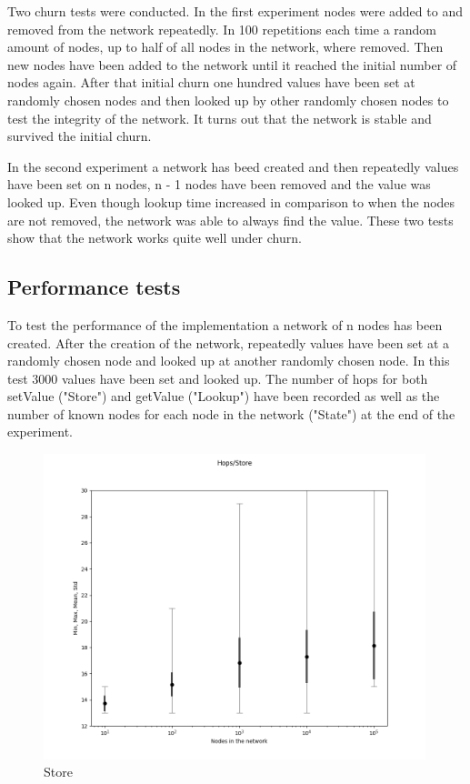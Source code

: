 \documentclass[a4paper, 12pt]{article} %
\begin{document}
Two churn tests were conducted. In the first experiment nodes were added to and removed from the network repeatedly. In 100 repetitions each time a random amount of nodes, up to half of all nodes in the network, where removed. Then new nodes have been added to the network until it reached the initial number of nodes again.  After that initial churn one hundred values have been set at randomly chosen nodes and then looked up by other randomly chosen nodes to test the integrity of the network. It turns out that the network is stable and survived the initial churn.

In the second experiment a network has beed created and then repeatedly values have been set on n nodes, n - 1 nodes have been removed and the value was looked up. Even though lookup time increased in comparison to when the nodes are not removed, the network was able to always find the value. These two tests show that the network works quite well under churn.

\subsection{Performance tests}

To test the performance of the implementation a network of n nodes has been created. After the creation of the network, repeatedly values have been set at a randomly chosen node and looked up at another randomly chosen node. In this test 3000 values have been set and looked up. The number of hops for both setValue ("Store") and getValue ("Lookup") have been recorded as well as the number of known nodes for each node in the network ("State") at the end of the experiment.

\begin{figure}[ht]
    \caption{Store}
    \centering
    \includegraphics[width=0.99\textwidth]{images/set_figure.png}
\end{figure}
\end{document}
